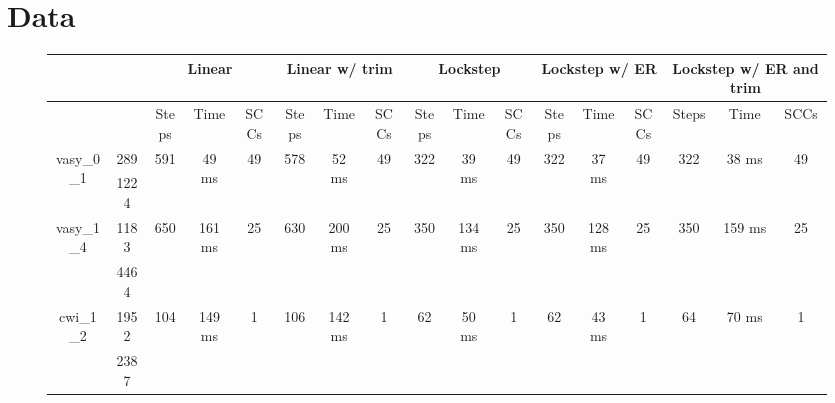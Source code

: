 \documentclass[../master/master.tex]{subfiles}
\begin{document}
\section{Data}
\begin{figure}
\begin{adjustbox}{angle=90}
\centering
\begin{tabular}{ |c|c||c|c|c||c|c|c||c|c|c||c|c|c||c|c|c|| } 
\hline
 \multicolumn{2}{|c||}{} & \multicolumn{3}{c||}{Linear} & \multicolumn{3}{c||}{Linear w/ trim} & \multicolumn{3}{c||}{Lockstep} & \multicolumn{3}{c||}{Lockstep w/ ER} & \multicolumn{3}{c||}{Lockstep w/ ER and trim}\\
\hline
\multicolumn{2}{|c||}{}& Steps & Time & SCCs& Steps & Time & SCCs& Steps & Time & SCCs& Steps & Time & SCCs& Steps & Time & SCCs\\
\hline
\multirow{2}{3.6em}{vasy\_0\_1} & 289 & \multirow{2}{3.6em}{591} & \multirow{2}{3.6em}{49 ms} & \multirow{2}{3.6em}{49} & \multirow{2}{3.6em}{578} & \multirow{2}{3.6em}{52 ms} & \multirow{2}{3.6em}{49} & \multirow{2}{3.6em}{322} & \multirow{2}{3.6em}{39 ms} & \multirow{2}{3.6em}{49} & \multirow{2}{3.6em}{322} & \multirow{2}{3.6em}{37 ms} & \multirow{2}{3.6em}{49} & \multirow{2}{3.6em}{322} & \multirow{2}{3.6em}{38 ms} & \multirow{2}{3.6em}{49} \\
\cline{2-2}
 & 1224  &  &  &  &  &  &  &  &  &  &  &  &  &  &  &  \\
\hline
\multirow{2}{3.6em}{vasy\_1\_4} & 1183 & \multirow{2}{3.6em}{650} & \multirow{2}{3.6em}{161 ms} & \multirow{2}{3.6em}{25} & \multirow{2}{3.6em}{630} & \multirow{2}{3.6em}{200 ms} & \multirow{2}{3.6em}{25} & \multirow{2}{3.6em}{350} & \multirow{2}{3.6em}{134 ms} & \multirow{2}{3.6em}{25} & \multirow{2}{3.6em}{350} & \multirow{2}{3.6em}{128 ms} & \multirow{2}{3.6em}{25} & \multirow{2}{3.6em}{350} & \multirow{2}{3.6em}{159 ms} & \multirow{2}{3.6em}{25} \\
\cline{2-2}
 & 4464  &  &  &  &  &  &  &  &  &  &  &  &  &  &  &  \\
\hline
\multirow{2}{3.6em}{cwi\_1\_2} & 1952 & \multirow{2}{3.6em}{104} & \multirow{2}{3.6em}{149 ms} & \multirow{2}{3.6em}{1} & \multirow{2}{3.6em}{106} & \multirow{2}{3.6em}{142 ms} & \multirow{2}{3.6em}{1} & \multirow{2}{3.6em}{62} & \multirow{2}{3.6em}{50 ms} & \multirow{2}{3.6em}{1} & \multirow{2}{3.6em}{62} & \multirow{2}{3.6em}{43 ms} & \multirow{2}{3.6em}{1} & \multirow{2}{3.6em}{64} & \multirow{2}{3.6em}{70 ms} & \multirow{2}{3.6em}{1} \\
\cline{2-2}
 & 2387  &  &  &  &  &  &  &  &  &  &  &  &  &  &  &  \\

\end{tabular}
\end{adjustbox}
\end{figure}
\end{document}
